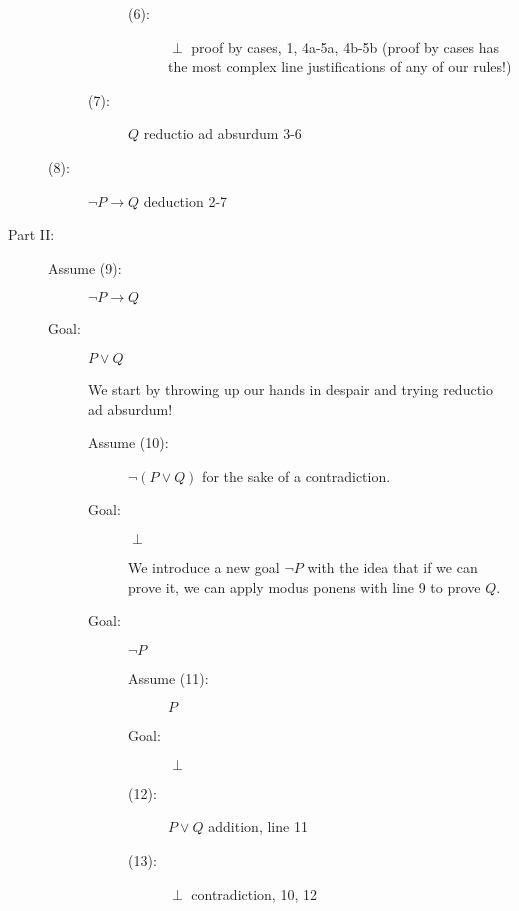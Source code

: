 \documentclass[12pt]{book}
\begin{document}
\begin{description}
\begin{description}
\begin{description}
\begin{description}
\begin{description}
\end{description}

\item[(6):]  $\perp$ proof by cases, 1, 4a-5a, 4b-5b (proof by cases has the most complex line justifications of any of our rules!)

\end{description}

\item[(7):]  $Q$  reductio ad absurdum 3-6

\end{description}

\item[(8):]  $\neg P \rightarrow Q$ deduction 2-7

\end{description}

\newpage


\item[Part II:]

\begin{description}

\item[Assume (9):]  $\neg P \rightarrow Q$

\item[Goal:]  $P \vee Q$

We start by throwing up our hands in despair and trying reductio ad absurdum!

\begin{description}

\item[Assume (10):]  $\neg(P \vee Q)$ for the sake of a contradiction.

\item[Goal:]  $\perp$

We introduce a new goal $\neg P$ with the idea that if we can prove it, we can apply modus ponens with line 9 to prove $Q$.

\item[Goal:]  $\neg P$

\begin{description}

\item[Assume (11):]  $P$ 

\item[Goal:]  $\perp$

\item [(12):]   $P \vee Q$ addition, line 11

\item [(13):]  $\perp$  contradiction, 10, 12


\end{description}
\end{description}
\end{description}
\end{description}
\end{document}
